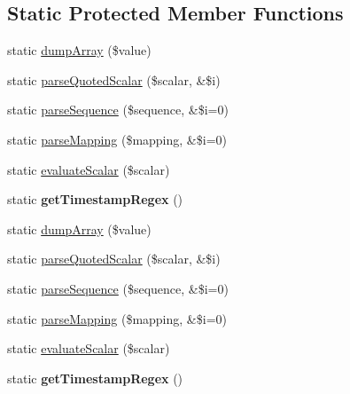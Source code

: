 \subsection*{Static Protected Member Functions}
\begin{DoxyCompactItemize}
\item 
static \hyperlink{class_symfony_1_1_components_1_1_yaml_1_1_inline_a14a553e044884f70a2f8fbbd4f2d21ac}{dumpArray} (\$value)
\item 
static \hyperlink{class_symfony_1_1_components_1_1_yaml_1_1_inline_a217fb6f105d374552ebb185da7e13fc6}{parseQuotedScalar} (\$scalar, \&\$i)
\item 
static \hyperlink{class_symfony_1_1_components_1_1_yaml_1_1_inline_a841085bbaa638bd7c47b77bd167d47bc}{parseSequence} (\$sequence, \&\$i=0)
\item 
static \hyperlink{class_symfony_1_1_components_1_1_yaml_1_1_inline_a75c88cc2a3f4c2cf7f23330baa0d0a9f}{parseMapping} (\$mapping, \&\$i=0)
\item 
static \hyperlink{class_symfony_1_1_components_1_1_yaml_1_1_inline_a65675de8bf326ce4d0f1833119db3bd5}{evaluateScalar} (\$scalar)
\item 
\hypertarget{class_symfony_1_1_components_1_1_yaml_1_1_inline_a1d4101aacfa859fd673067059e704239}{
static {\bfseries getTimestampRegex} ()}
\label{class_symfony_1_1_components_1_1_yaml_1_1_inline_a1d4101aacfa859fd673067059e704239}

\item 
static \hyperlink{class_symfony_1_1_components_1_1_yaml_1_1_inline_a14a553e044884f70a2f8fbbd4f2d21ac}{dumpArray} (\$value)
\item 
static \hyperlink{class_symfony_1_1_components_1_1_yaml_1_1_inline_a217fb6f105d374552ebb185da7e13fc6}{parseQuotedScalar} (\$scalar, \&\$i)
\item 
static \hyperlink{class_symfony_1_1_components_1_1_yaml_1_1_inline_a841085bbaa638bd7c47b77bd167d47bc}{parseSequence} (\$sequence, \&\$i=0)
\item 
static \hyperlink{class_symfony_1_1_components_1_1_yaml_1_1_inline_a75c88cc2a3f4c2cf7f23330baa0d0a9f}{parseMapping} (\$mapping, \&\$i=0)
\item 
static \hyperlink{class_symfony_1_1_components_1_1_yaml_1_1_inline_a65675de8bf326ce4d0f1833119db3bd5}{evaluateScalar} (\$scalar)
\item 
\hypertarget{class_symfony_1_1_components_1_1_yaml_1_1_inline_a1d4101aacfa859fd673067059e704239}{
static {\bfseries getTimestampRegex} ()}
\label{class_symfony_1_1_components_1_1_yaml_1_1_inline_a1d4101aacfa859fd673067059e704239}

\end{DoxyCompactItemize}


